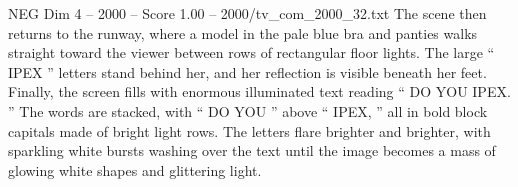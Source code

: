 \begin{textsample}{NEG Dim 4 – 2000 – Score 1.00 – 2000/tv\_com\_2000\_32.txt}
The scene then returns to the runway, where a model in the pale blue bra and panties walks straight toward the viewer between rows of rectangular floor lights.
The large “ IPEX ” letters stand behind her, and her reflection is visible beneath her feet.
Finally, the screen fills with enormous illuminated text reading “ DO YOU IPEX. ” The words are stacked, with “ DO YOU ” above “ IPEX, ” all in bold block capitals made of bright light rows.
The letters flare brighter and brighter, with sparkling white bursts washing over the text until the image becomes a mass of glowing white shapes and glittering light.

\end{textsample}
